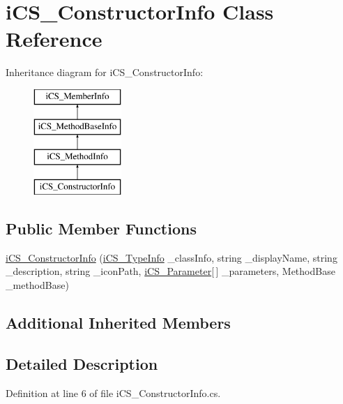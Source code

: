 \hypertarget{classi_c_s___constructor_info}{\section{i\+C\+S\+\_\+\+Constructor\+Info Class Reference}
\label{classi_c_s___constructor_info}
}
Inheritance diagram for i\+C\+S\+\_\+\+Constructor\+Info\+:\begin{figure}[H]
\begin{center}
\leavevmode
\includegraphics[height=4.000000cm]{classi_c_s___constructor_info}
\end{center}
\end{figure}
\subsection*{Public Member Functions}
\begin{DoxyCompactItemize}
\item 
\hyperlink{classi_c_s___constructor_info_af623b061613d9042ad4051ef249a0816}{i\+C\+S\+\_\+\+Constructor\+Info} (\hyperlink{classi_c_s___type_info}{i\+C\+S\+\_\+\+Type\+Info} \+\_\+class\+Info, string \+\_\+display\+Name, string \+\_\+description, string \+\_\+icon\+Path, \hyperlink{classi_c_s___parameter}{i\+C\+S\+\_\+\+Parameter}\mbox{[}$\,$\mbox{]} \+\_\+parameters, Method\+Base \+\_\+method\+Base)
\end{DoxyCompactItemize}
\subsection*{Additional Inherited Members}


\subsection{Detailed Description}


Definition at line 6 of file i\+C\+S\+\_\+\+Constructor\+Info.\+cs.



